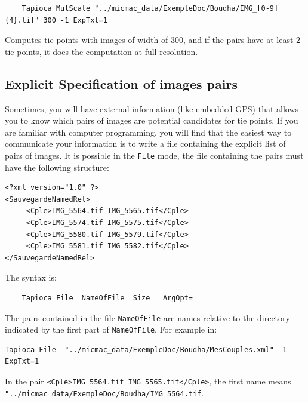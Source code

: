 {\scriptsize
\begin{verbatim}
    Tapioca MulScale "../micmac_data/ExempleDoc/Boudha/IMG_[0-9]{4}.tif" 300 -1 ExpTxt=1
\end{verbatim}
}

Computes  tie points with images of width of $300$, and if the pairs have at least
$2$ tie points, it does the computation at full resolution.



\subsection{Explicit Specification of images pairs} %

Sometimes, you will have external information (like embedded GPS) that allows
you to know which pairs of images are potential candidates for tie points.
If you are familiar with computer programming, you will find that
the easiest way to communicate your information is to write a file
containing the explicit list of pairs of images.
It is possible in the {\tt File} mode, the file containing
the pairs must have the following structure:

{\scriptsize
\begin{verbatim}
<?xml version="1.0" ?>
<SauvegardeNamedRel>
     <Cple>IMG_5564.tif IMG_5565.tif</Cple>
     <Cple>IMG_5574.tif IMG_5575.tif</Cple>
     <Cple>IMG_5580.tif IMG_5579.tif</Cple>
     <Cple>IMG_5581.tif IMG_5582.tif</Cple>
</SauvegardeNamedRel>
\end{verbatim}
}

The syntax is:


{\scriptsize
\begin{verbatim}
    Tapioca File  NameOfFile  Size   ArgOpt=
\end{verbatim}
}

The pairs contained in the file {\tt NameOfFile} are names relative
to the directory indicated by the first part of {\tt NameOfFile}.
For example in:

{\scriptsize
\begin{verbatim}
Tapioca File  "../micmac_data/ExempleDoc/Boudha/MesCouples.xml" -1  ExpTxt=1
\end{verbatim}
}


In the pair {\tt <Cple>IMG\_5564.tif IMG\_5565.tif</Cple>}, the first name means
\newline
{\tt "../micmac\_data/ExempleDoc/Boudha/IMG\_5564.tif}.




